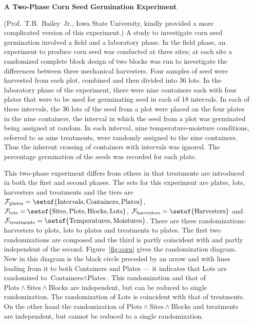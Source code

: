 \begin{flushleft}\Large\bf A Two-Phase Corn Seed Germination Experiment
\end{flushleft}

(Prof.~T.B.~Bailey~Jr., Iowa State University, kindly provided 
a more complicated version of this experiment.)
A study to investigate corn seed germination involved a field and a
laboratory phase.  In the field phase, an experiment to produce corn seed
was conducted at three sites; at each site a randomized complete block
design of two blocks was run to investigate the differences between three
mechanical harvesters.  Four samples of seed were harvested from each plot,
combined %
and then divided into 36 lots.  In the laboratory phase of the 
experiment, there were nine
containers each with four plates that were to be used for germinating seed
in each of 18 intervals.  In each of these intervals, the 36 lots of the
seed from a plot were placed on the four plates in the nine
containers, the interval in which the seed from a plot was germinated
being assigned at random.  In
each interval, nine temperature-moisture conditions, referred to as nine
treatments, were randomly assigned to the nine containers.  
Thus the inherent crossing of containers with intervals was ignored.
The percentage germination of the seeds was recorded for each
plate.

This two-phase experiment differs from others in
that treatments are introduced in both the first and second phases.  The
sets for this experiment are plates, lots, harvesters and treatments and
the tiers are 
${\cal F}_{\rm plates} = \setof{\mbox{Intervals}, 
\mbox{Containers}, \mbox{Plates}}$, ${\cal F}_{\rm lots} = 
\setof{\mbox{Sites}, \mbox{Plots}, \mbox{Blocks}, \mbox{Lots}}$, 
${\cal F}_{\rm harvesters} = \setof{\mbox{Harvesters}}$ and 
${\cal F}_{\rm treatments} = \setof{\mbox{Temperatures},
\mbox{Moistures}}$.  There are three randomizations: harvesters to plots, 
lots to plates and treatments to plates.  The first two randomizations are 
composed and the third is partly coincident with and partly independent of 
the second. Figure~\ref{fig:corn} gives the randomization diagram. New in this 
diagram is the black circle preceded by an arrow and with lines leading from 
it to both Containers and Plates --- it indicates that Lots are randomized to 
$\mbox{Containers}\wedge\mbox{Plates}$. This randomization and that of 
$\mbox{Plots}\wedge\mbox{Sites}\wedge\mbox{Blocks}$ are independent, 
but can be reduced to single randomization. The randomization of Lots 
is coincident with that of treatments. On the other hand the randomization of 
$\mbox{Plots}\wedge\mbox{Sites}\wedge\mbox{Blocks}$ and treatments are 
independent, but cannot be reduced to a single randomization.

